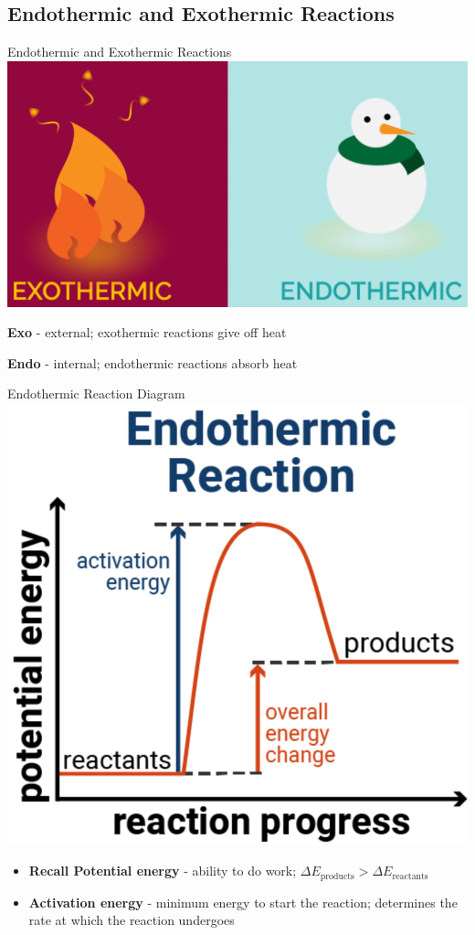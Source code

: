 \documentclass[11pt]{beamer}
\begin{document}
\subsection{Endothermic and Exothermic Reactions}

\begin{frame}{Endothermic and Exothermic Reactions}
  \centering
  \includegraphics[width=0.8\linewidth]{exo_endo}

  \textbf{Exo} - external; exothermic reactions give off
  heat

  \textbf{Endo} - internal; endothermic reactions absorb
  heat
\end{frame}

\begin{frame}{Endothermic Reaction Diagram}
  \centering
  \includegraphics[width=0.5\linewidth]{endo_rxn}

  \begin{itemize}
  \item \textbf{Recall Potential energy} - ability to do
    work; $\Delta E_\text{products} > \Delta E_\text{reactants}$
  \item \textbf{Activation energy} - minimum energy to start the
    reaction; determines the rate at which the reaction undergoes
  \end{itemize}
\end{frame}
\end{document}
